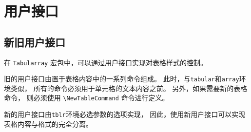 \documentclass[oneside]{book}
\begin{document}
\chapter{用户接口}

\section{新旧用户接口}

在 \verb!Tabularray! 宏包中，可以通过用户接口实现对表格样式的控制。

旧的用户接口由置于表格内容中的一系列命令组成。
此时，与\verb!tabular!和\verb!array!环境类似，
所有的命令\textcolor{red3}{必须}用于单元格的文本内容之前。
另外，如果需要新的表格命令，
则\textcolor{red3}{必须}使用 \verb!\NewTableCommand! 命令进行定义。


新的用户接口由\verb!tblr!环境必选参数的选项实现，
因此，使用新用户接口可以实现表格内容与格式的完全分离。
\end{document}
